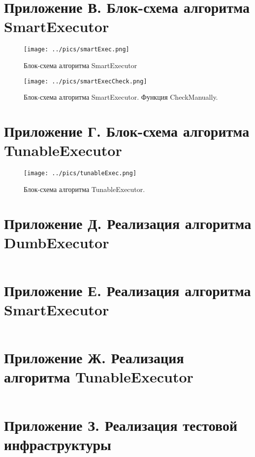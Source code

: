 \documentclass{matmex-diploma}
\begin{document}
\section*{Приложение В. Блок-схема алгоритма SmartExecutor}
    \begin{figure}[H]
        \centering
        \texttt{[image: ../pics/smartExec.png]}
        \caption{Блок-схема алгоритма SmartExecutor}
        \label{smartAlgo}
    \end{figure}
    \begin{figure}[H]
        \centering
        \texttt{[image: ../pics/smartExecCheck.png]}
        \caption{Блок-схема алгоритма SmartExecutor. Функция CheckManually.}
        \label{smartCheck}
    \end{figure}
\section*{Приложение Г. Блок-схема алгоритма TunableExecutor}
    \begin{figure}[H]
        \centering
        \texttt{[image: ../pics/tunableExec.png]}
        \caption{Блок-схема алгоритма TunableExecutor.}
        \label{smartCheck}
    \end{figure}
\section*{Приложение Д. Реализация алгоритма DumbExecutor}
    \inputminted[breaklines=true]{java}{../sources/DumbExecutor.java}
\section*{Приложение Е. Реализация алгоритма SmartExecutor}
    \inputminted[breaklines=true]{java}{../sources/SmartExecutor.java}
\section*{Приложение Ж. Реализация алгоритма TunableExecutor}
    \inputminted[breaklines=true]{java}{../sources/TunableExecutor.java}
\section*{Приложение З. Реализация тестовой инфраструктуры}
    \inputminted[breaklines=true]{java}{../sources/TuningTest.java}
\end{document}
